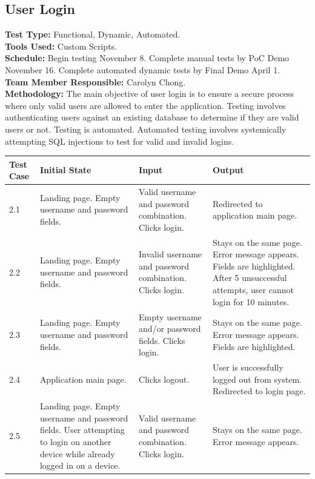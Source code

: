 \documentclass[12pt]{article}
\begin{document}
\subsection{User Login}
\textbf{Test Type:} Functional, Dynamic, Automated. \\
\textbf{Tools Used:} Custom Scripts. \\
\textbf{Schedule:} Begin testing November 8. Complete manual tests by PoC Demo November 16. Complete automated dynamic tests by Final Demo April 1. \\
\textbf{Team Member Responsible:} Carolyn Chong. \\
\textbf{Methodology:} The main objective of user login is to ensure a secure process where only valid users are allowed to enter the application. Testing involves authenticating users against an existing database to determine if they are valid users or not. Testing is automated. Automated testing involves systemically attempting SQL injections to test for valid and invalid logins.

\begin{longtable}{|p{2cm}|p{3cm}|p{5cm}|p{5cm}|}
\hline
\textbf{Test Case}  & \textbf{Initial State} & \textbf{Input} & \textbf{Output} \\ \hline
2.1 & Landing page. Empty username and password fields. & Valid username and password combination. Clicks login. & Redirected to application main page. \\ 
\hline
2.2 & Landing page. Empty username and password fields. & Invalid username and password combination. Clicks login. & Stays on the same page. Error message appears. Fields are highlighted. After 5 unsuccessful attempts, user cannot login for 10 minutes. \\
\hline
2.3 & Landing page. Empty username and password fields. & Empty username and/or password fields. Clicks login. & Stays on the same page. Error message appears. Fields are highlighted. \\
\hline
2.4 & Application main page. & Clicks logout. & User is successfully logged out from system. Redirected to login page. \\
\hline
2.5 & Landing page. Empty username and password fields. User attempting to login on another device while already logged in on a device. & Valid username and password combination. Clicks login. & Stays on the same page. Error message appears. \\ 
\hline
\end{longtable}
\end{document}
